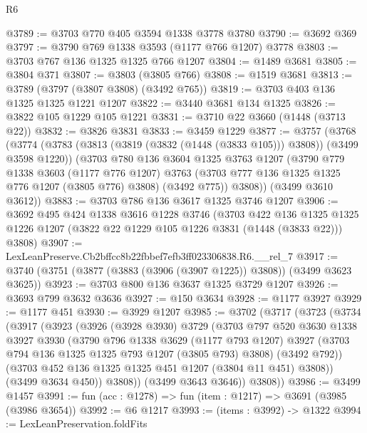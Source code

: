 \begin{lexlean}{R6}
\begin{coremodule}
@3789 := @3703 @770 @405 @3594 @1338 @3778 @3780
@3790 := @3692 @369
@3797 := @3790 @769 @1338 @3593 (@1177 @766 @1207) @3778
@3803 := @3703 @767 @136 @1325 @1325 @766 @1207
@3804 := @1489 @3681
@3805 := @3804 @371
@3807 := @3803 (@3805 @766)
@3808 := @1519 @3681
@3813 := @3789 (@3797 (@3807 @3808) (@3492 @765))
@3819 := @3703 @403 @136 @1325 @1325 @1221 @1207
@3822 := @3440 @3681 @134 @1325
@3826 := @3822 @105 @1229 @105 @1221
@3831 := @3710 @22 @3660 (@1448 (@3713 @22))
@3832 := @3826 @3831
@3833 := @3459 @1229
@3877 := @3757
    (@3768
      (@3774
        (@3783 (@3813 (@3819 (@3832 (@1448 (@3833 @105))) @3808)) (@3499 @3598 @1220))
        (@3703
          @780
          @136
          @3604
          @1325
          @3763
          @1207
          (@3790
            @779
            @1338
            @3603
            (@1177 @776 @1207)
            @3763
            (@3703 @777 @136 @1325 @1325 @776 @1207 (@3805 @776) @3808)
            (@3492 @775))
          @3808))
      (@3499 @3610 @3612))
@3883 := @3703 @786 @136 @3617 @1325 @3746 @1207
@3906 := @3692
    @495
    @424
    @1338
    @3616
    @1228
    @3746
    (@3703
      @422
      @136
      @1325
      @1325
      @1226
      @1207
      (@3822 @22 @1229 @105 @1226 @3831 (@1448 (@3833 @22)))
      @3808)
@3907 := LexLeanPreserve.Cb2bffcc8b22fbbef7efb3ff023306838.R6.__rel_7
@3917 := @3740 (@3751 (@3877 (@3883 (@3906 (@3907 @1225)) @3808)) (@3499 @3623 @3625))
@3923 := @3703 @800 @136 @3637 @1325 @3729 @1207
@3926 := @3693 @799 @3632 @3636
@3927 := @150 @3634
@3928 := @1177 @3927
@3929 := @1177 @451
@3930 := @3929 @1207
@3985 := @3702
    (@3717
      (@3723
        (@3734
          (@3917
            (@3923
              (@3926
                (@3928 @3930)
                @3729
                (@3703
                  @797
                  @520
                  @3630
                  @1338
                  @3927
                  @3930
                  (@3790
                    @796
                    @1338
                    @3629
                    (@1177 @793 @1207)
                    @3927
                    (@3703 @794 @136 @1325 @1325 @793 @1207 (@3805 @793) @3808)
                    (@3492 @792))
                  (@3703 @452 @136 @1325 @1325 @451 @1207 (@3804 @11 @451) @3808))
                (@3499 @3634 @450))
              @3808))
          (@3499 @3643 @3646))
        @3808))
@3986 := @3499 @1457
@3991 := fun (acc : @1278) => fun (item : @1217) => @3691 (@3985 (@3986 @3654))
@3992 := @6 @1217
@3993 := (items : @3992) -> @1322
@3994 := LexLeanPreservation.foldFits

\end{coremodule}
\end{lexlean}
